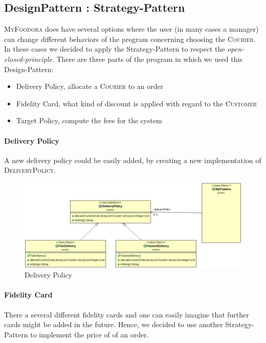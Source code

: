 \subsection{DesignPattern : Strategy-Pattern}
\label{sub:designpattern_strategy_pattern}

\textsc{MyFoodora} does have several options where the user (in many cases a manager) can change
different behaviors of the program concerning choosing the \textsc{Courier}. In these
cases we decided to apply the Strategy-Pattern to respect the \textit{open-closed-principle}.
There are three parts of the program in which we used this Design-Pattern:
\begin{itemize}
	\item Delivery Policy, allocate a \textsc{Courier} to an order
	\item Fidelity Card, what kind of discount is applied with regard to the
		\textsc{Customer}
	\item Target Policy, compute the fees for the system 
\end{itemize}

\paragraph{Delivery Policy}
\label{par:delivery_policy}
A new delivery policy could be easily added, by creating a new implementation of \textsc{DeliveryPolicy}.

\begin{figure}[H]
	\centering
	\includegraphics[width=1\linewidth]{./ima/deliverypolicy.jpg}
	\caption{Delivery Policy}
	\label{fig:deliveryPolicy}
\end{figure}

\paragraph{Fidelity Card}
\label{par:fideltycard}

There a several different fidelity cards and one can easily imagine that further cards might be 
added in the future. Hence, we decided to use another Strategy-Pattern to implement the price of
of an order. 

